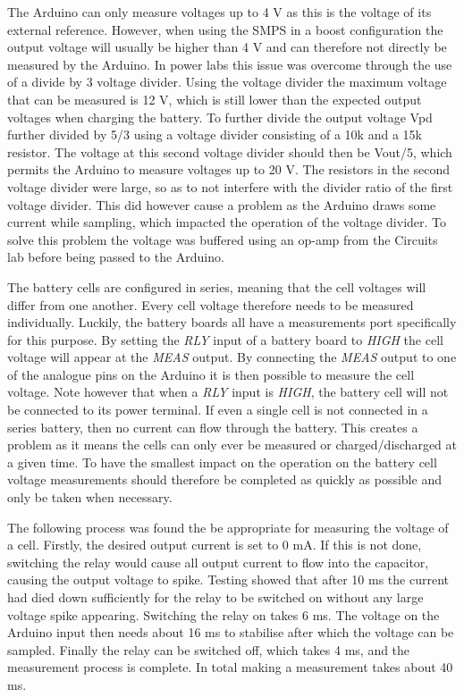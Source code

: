\documentclass[a4paper]{article}
\begin{document}
The Arduino can only measure voltages up to 4 V as this is the voltage of its external
reference. However, when using the SMPS in a boost configuration the output voltage will
usually be higher than 4 V and can therefore not directly be measured by the Arduino.
In power labs this issue was overcome through the use of a divide by 3 voltage divider\cite{powerLogbook}.
Using the voltage divider the maximum voltage that can be measured is 12 V, which is still
lower than the expected output voltages when charging the battery. To further divide
the output voltage Vpd further divided by 5/3 using a voltage divider consisting of a 10k
and a 15k resistor. The voltage at this second voltage divider should then be Vout/5, 
which permits the Arduino to measure voltages up to 20 V. The
resistors in the second voltage divider were large, so as to not interfere with the divider
ratio of the first voltage divider. This did however cause a problem as the Arduino draws
some current while sampling, which impacted the operation of the voltage divider. 
To solve this problem the voltage was buffered using an op-amp 
from the Circuits lab before being passed to the Arduino.

The battery cells are configured in series, meaning that the cell voltages will differ from
one another. Every cell voltage therefore needs to be measured individually. Luckily,
the battery boards all have a measurements port specifically for this purpose. By setting
the \emph{RLY} input of a battery board to \emph{HIGH} the cell voltage will appear at the
\emph{MEAS} output. By connecting the \emph{MEAS} output to one of the analogue pins
on the Arduino it is then possible to measure the cell voltage. Note however that when a 
\emph{RLY} input is \emph{HIGH}, the battery cell will not be connected to its power
terminal. If even a single cell is not connected in a series battery, then no current
can flow through the battery. This creates a problem as it means the cells can only 
ever be measured or charged/discharged at a given time. To have the smallest 
impact on the operation on the battery cell voltage measurements should therefore 
be completed as quickly as possible and only be taken when necessary.

The following process was found the be appropriate for measuring the voltage 
of a cell. Firstly, the desired output current is set to 0 mA. If this is not done, 
switching the relay would cause all output current to flow into the capacitor, 
causing the output voltage to spike. Testing showed that after 10 ms the current 
had died down sufficiently for the relay
to be switched on without any large voltage spike appearing. Switching the relay on
takes 6 ms\cite{axicom}. The voltage on the Arduino input then needs about 16 ms to
stabilise after which the voltage can be sampled. Finally the relay can be switched off, which
takes 4 ms, and the measurement process is complete. In total making a measurement takes
about 40 ms. 
\end{document}
